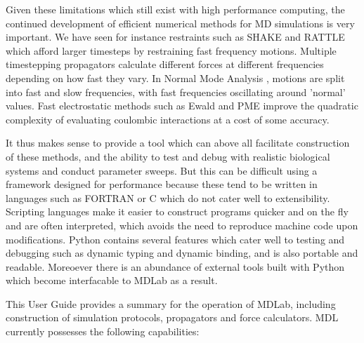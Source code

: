 \documentclass[11pt]{report}
\begin{document}
Given these limitations which still exist with high performance
computing, the continued development of efficient numerical
methods for MD simulations is very important.  We have seen
for instance restraints such as SHAKE \cite{GUNS77} and RATTLE \cite{Ande83}
which afford larger timesteps by restraining fast frequency
motions.  Multiple timestepping propagators calculate different
forces at different frequencies depending on how fast they
vary.  In Normal Mode Analysis \cite{}, motions are split into
fast and slow frequencies, with fast frequencies oscillating
around 'normal' values.  Fast electrostatic methods such as Ewald \cite{Ewal21}
and PME \cite{DaYP93} improve the quadratic complexity of evaluating
coulombic interactions at a cost of some accuracy.


It thus makes sense to provide a tool which can above all facilitate 
construction of these methods, and the ability to test and debug with 
realistic biological systems and conduct parameter sweeps.  But this can
be difficult using a framework designed for performance because these
tend to be written in languages such as FORTRAN or C which do
not cater well to extensibility.  Scripting languages make it easier
to construct programs quicker and on the fly and are often interpreted,
which avoids the need to reproduce machine code upon modifications.
Python contains several features which cater well to testing and debugging
such as dynamic typing and dynamic binding, and is also portable
and readable.  Moreoever there is an abundance of external tools built
 with Python which become interfacable to MDLab as a result.


This User Guide provides a summary for the operation of MDLab,
including construction of simulation protocols, propagators and
force calculators.  MDL currently possesses the following capabilities:
\end{document}
